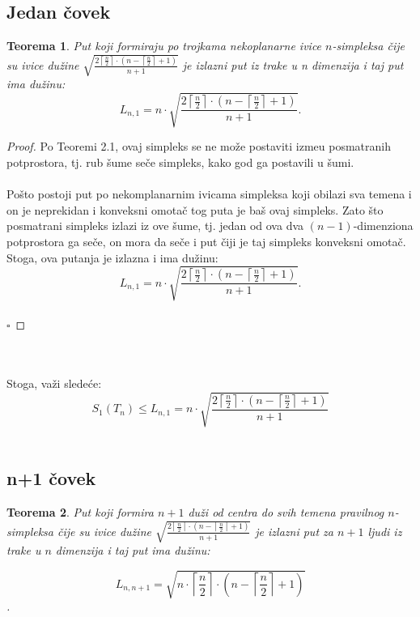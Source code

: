 \documentclass[11pt,letter]{article}
\newtheorem{teo}{\bf Teorema}[section]
\begin{document}
\subsection[Jedan \v covek]{Jedan \v covek}
\bigskip
\begin{teo} Put koji formiraju po trojkama nekoplanarne ivice $n$-simpleksa \v cije su ivice du\v zine $\sqrt{\frac{2\left\lceil \frac{n}{2}\right\rceil\cdot \left( n-\left\lceil\frac{n}{2}\right\rceil+1\right)}{n+1}}$ je izlazni put iz trake u n dimenzija i taj put ima du\v zinu:
$$L_{n,1}=n\cdot \sqrt{\frac{2\left\lceil \frac{n}{2}\right\rceil\cdot \left( n-\left\lceil\frac{n}{2}\right\rceil+1\right)}{n+1}}.$$\end{teo}
\smallskip

\begin{proof}
Po Teoremi 2.1, ovaj simpleks se ne mo\v ze postaviti izme\dj u posmatranih potprostora, tj. rub \v sume se\v ce simpleks, kako god ga postavili u \v sumi.
\\
\\
\indent Po\v sto postoji put po nekomplanarnim ivicama simpleksa koji obilazi sva temena i on je neprekidan i konveksni omota\v c tog puta je ba\v s ovaj simpleks. Zato \v sto posmatrani simpleks izlazi iz ove \v sume, tj. jedan od ova dva $(n-1)$-dimenziona potprostora ga se\v ce, on mora da se\v ce i put \v ciji je taj simpleks konveksni omota\v c. Stoga, ova putanja je izlazna i ima du\v zinu:
\\
$$L_{n,1}=n\cdot \sqrt{\frac{2\left\lceil \frac{n}{2}\right\rceil\cdot \left( n-\left\lceil\frac{n}{2}\right\rceil+1\right)}{n+1}}.$$
\\
$\square$
\end{proof}
\\
\\
\indent Stoga, va\v zi slede\' ce:
$$S_1(T_n)\leqslant L_{n, 1}=n\cdot \sqrt{\frac{2\left\lceil \frac{n}{2}\right\rceil\cdot \left( n-\left\lceil\frac{n}{2}\right\rceil+1\right)}{n+1}}$$
\\
\subsection[n+1 \v covek]{n+1 \v covek} 
\bigskip
\begin{teo} Put koji formira $n+1$ du\v zi od centra do svih temena pravilnog $n$-simpleksa  \v cije su ivice du\v zine $\sqrt{\frac{2\left\lceil \frac{n}{2}\right\rceil\cdot \left( n-\left\lceil\frac{n}{2}\right\rceil+1\right)}{n+1}}$ je izlazni put za $n+1$ ljudi iz trake u $n$ dimenzija i taj put ima du\v zinu:

$$L_{n,n+1}=\sqrt{n\cdot\left\lceil\frac{n}{2}\right\rceil\cdot\left( n-\left\lceil\frac{n}{2}\right\rceil+1\right)}$$.\end{teo}
\end{document}
